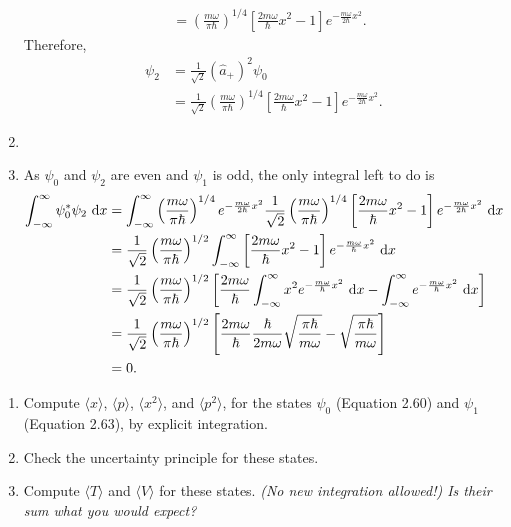 \documentclass[en, oneside]{vivi}
\begin{document}
\begin{sol}
\begin{enumerate}[label=(\alph*)]
\begin{align*}
            &= \left( \frac{m \omega}{\pi \hbar} \right)^{1/4} \left[\frac{2 m \omega}{\hbar} x^2 - 1\right] e^{-\frac{m \omega}{2\hbar}x^2}.
        \end{align*}
        Therefore,
        \begin{align*}
            \psi_2 &= \frac{1}{\sqrt{2}} \left( \hat a_+ \right)^2 \psi_0\\
            &= \frac{1}{\sqrt{2}} \left( \frac{m \omega}{\pi \hbar} \right)^{1/4} \left[\frac{2 m \omega}{\hbar} x^2 - 1\right] e^{-\frac{m \omega}{2\hbar}x^2}.
        \end{align*}
        \item 
        \item As $\psi_0$ and $\psi_2$ are even and $\psi_1$ is odd, the only integral left to do is
        \begin{align*}
            \int_{-\infty}^{\infty} \psi_0^* \psi_2 \dif x &= \int_{-\infty}^{\infty} \left( \frac{m \omega}{\pi \hbar} \right)^{1/4} e^{-\frac{m \omega}{2\hbar}x^2} \frac{1}{\sqrt{2}} \left( \frac{m \omega}{\pi \hbar} \right)^{1/4} \left[\frac{2 m \omega}{\hbar} x^2 - 1\right] e^{-\frac{m \omega}{2\hbar}x^2} \dif x\\
            &= \frac{1}{\sqrt{2}} \left( \frac{m \omega}{\pi \hbar} \right)^{1/2} \int_{-\infty}^{\infty} \left[\frac{2 m \omega}{\hbar} x^2 - 1\right] e^{-\frac{m \omega}{\hbar}x^2} \dif x\\
            &= \frac{1}{\sqrt{2}} \left( \frac{m \omega}{\pi \hbar} \right)^{1/2} \left[ \frac{2 m \omega}{\hbar} \int_{-\infty}^{\infty} x^2 e^{-\frac{m \omega}{\hbar}x^2} \dif x - \int_{-\infty}^{\infty} e^{-\frac{m \omega}{\hbar}x^2} \dif x \right]\\
            &= \frac{1}{\sqrt{2}} \left( \frac{m \omega}{\pi \hbar} \right)^{1/2} \left[ \frac{2 m \omega}{\hbar} \frac{\hbar}{2 m \omega} \sqrt{\frac{\pi \hbar}{m \omega}} - \sqrt{\frac{\pi \hbar}{m \omega}} \right]\\
            &= 0.
        \end{align*}
    \end{enumerate}
\end{sol}
\begin{prob}
    \bigskip
    \begin{enumerate}[label=(\alph*)]
        \item Compute $\langle x \rangle$, $\langle p \rangle$, $\langle x^2 \rangle$, and $\langle p^2 \rangle$, for the states $\psi_0$ (Equation 2.60) and $\psi_1$ (Equation 2.63), by explicit integration.
        \item Check the uncertainty principle for these states.
        \item Compute $\langle T \rangle$ and $\langle V \rangle$ for these states. 
        \textit{(No new integration allowed!) Is their sum what you would expect?}
    \end{enumerate}
\end{prob}
\end{document}
